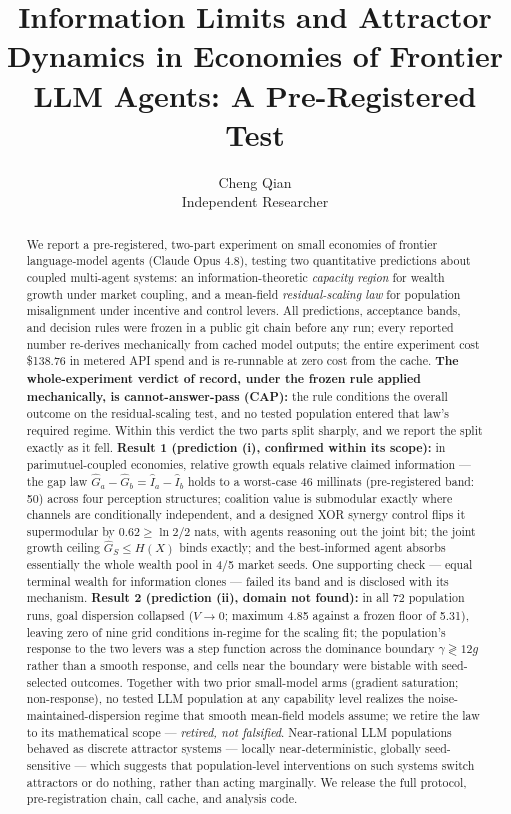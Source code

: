\documentclass{article} %
\title{Information Limits and Attractor Dynamics in Economies of Frontier LLM Agents: A Pre-Registered Test}
\author{\name Cheng Qian \\
\addr Independent Researcher}
\newcommand{\Ihat}{\hat{I}}
\newcommand{\Ghat}{\hat{G}}
\begin{document}
\maketitle

\begin{abstract}
We report a pre-registered, two-part experiment on small economies of frontier language-model agents (Claude Opus 4.8), testing two quantitative predictions about coupled multi-agent systems: an information-theoretic \emph{capacity region} for wealth growth under market coupling, and a mean-field \emph{residual-scaling law} for population misalignment under incentive and control levers. All predictions, acceptance bands, and decision rules were frozen in a public git chain before any run; every reported number re-derives mechanically from cached model outputs; the entire experiment cost \$138.76 in metered API spend and is re-runnable at zero cost from the cache. \textbf{The whole-experiment verdict of record, under the frozen rule applied mechanically, is cannot-answer-pass (CAP):} the rule conditions the overall outcome on the residual-scaling test, and no tested population entered that law's required regime. Within this verdict the two parts split sharply, and we report the split exactly as it fell. \textbf{Result 1 (prediction (i), confirmed within its scope):} in parimutuel-coupled economies, relative growth equals relative claimed information --- the gap law $\Ghat_a - \Ghat_b = \Ihat_a - \Ihat_b$ holds to a worst-case 46 millinats (pre-registered band: 50) across four perception structures; coalition value is submodular exactly where channels are conditionally independent, and a designed XOR synergy control flips it supermodular by $0.62 \geq \ln 2/2$ nats, with agents reasoning out the joint bit; the joint growth ceiling $\Ghat_S \le H(X)$ binds exactly; and the best-informed agent absorbs essentially the whole wealth pool in 4/5 market seeds. One supporting check --- equal terminal wealth for information clones --- failed its band and is disclosed with its mechanism. \textbf{Result 2 (prediction (ii), domain not found):} in all 72 population runs, goal dispersion collapsed ($V \to 0$; maximum 4.85 against a frozen floor of 5.31), leaving zero of nine grid conditions in-regime for the scaling fit; the population's response to the two levers was a step function across the dominance boundary $\gamma \gtrless 12g$ rather than a smooth response, and cells near the boundary were bistable with seed-selected outcomes. Together with two prior small-model arms (gradient saturation; non-response), no tested LLM population at any capability level realizes the noise-maintained-dispersion regime that smooth mean-field models assume; we retire the law to its mathematical scope --- \emph{retired, not falsified}. Near-rational LLM populations behaved as discrete attractor systems --- locally near-deterministic, globally seed-sensitive --- which suggests that population-level interventions on such systems switch attractors or do nothing, rather than acting marginally. We release the full protocol, pre-registration chain, call cache, and analysis code.
\end{abstract}
\end{document}
